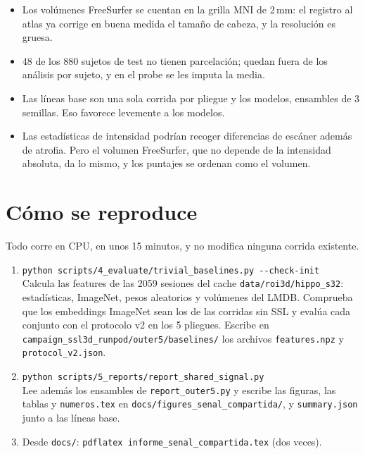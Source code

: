 \documentclass[11pt,a4paper]{article}
\begin{document}
\begin{warnbox}
\begin{itemize}
  \item Los volúmenes FreeSurfer se cuentan en la grilla MNI de 2\,mm: el registro al
        atlas ya corrige en buena medida el tamaño de cabeza, y la resolución es gruesa.
  \item 48 de los 880 sujetos de test no tienen parcelación; quedan fuera de los
        análisis por sujeto, y en el probe se les imputa la media.
  \item Las líneas base son una sola corrida por pliegue y los modelos, ensambles de 3
        semillas. Eso favorece levemente a los modelos.
  \item Las estadísticas de intensidad podrían recoger diferencias de escáner además de
        atrofia. Pero el volumen FreeSurfer, que no depende de la intensidad absoluta,
        da lo mismo, y los puntajes se ordenan como el volumen.
\end{itemize}
\end{warnbox}

\appendix
\section{Cómo se reproduce}

Todo corre en CPU, en unos 15 minutos, y no modifica ninguna corrida existente.
\begin{enumerate}
  \item \texttt{python scripts/4\_evaluate/trivial\_baselines.py -{}-check-init}\\
        Calcula las features de las 2059 sesiones del cache \texttt{data/roi3d/hippo\_s32}:
        estadísticas, ImageNet, pesos aleatorios y volúmenes del LMDB. Comprueba que los
        embeddings ImageNet sean los de las corridas sin SSL y evalúa cada conjunto con
        el protocolo v2 en los 5 pliegues. Escribe en
        \texttt{campaign\_ssl3d\_runpod/outer5/baselines/} los archivos
        \texttt{features.npz} y \texttt{protocol\_v2.json}.
  \item \texttt{python scripts/5\_reports/report\_shared\_signal.py}\\
        Lee además los ensambles de \texttt{report\_outer5.py} y escribe las figuras, las
        tablas y \texttt{numeros.tex} en \texttt{docs/figures\_senal\_compartida/}, y
        \texttt{summary.json} junto a las líneas base.
  \item Desde \texttt{docs/}: \texttt{pdflatex informe\_senal\_compartida.tex} (dos veces).
\end{enumerate}
\end{document}
